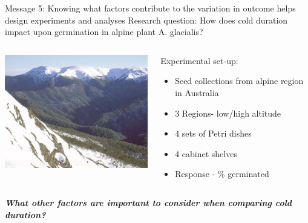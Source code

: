 \documentclass{beamer}
\begin{document}
\begin{frame}{Message 5: Knowing what factors contribute to the variation in outcome helps design experiments and analyses}
 \pause
 Research question: 
How does cold duration impact upon germination in alpine plant A. glacialis?

  \begin{columns}
    \begin{column}{0.5\textwidth}
	\begin{center}
	\includegraphics[width=\textwidth]{Figures/message5}
	\end{center}
    \end{column}
    
    \begin{column}{0.5\textwidth}
    \begin{block}{Experimental set-up:}
      \begin{itemize}
	\item Seed collections from alpine region in Australia
	\item 3 Regions- low/high altitude
	\item 4 sets of Petri dishes
	\item 4 cabinet shelves
	\item Response - \% germinated
      \end{itemize}
      \end{block}
    \end{column}
  \end{columns}
   \vspace{0.1cm}
  \textbf{\emph{What other factors are important to consider when comparing cold duration? }}
\end{frame}
\end{document}
